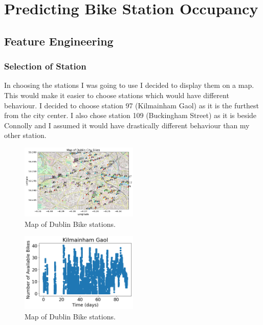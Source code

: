 \maketitle


\section{Predicting Bike Station Occupancy}
\subsection{Feature Engineering}
\subsubsection{Selection of Station}
In choosing the stations I was going to use I decided to display them on a map.
This would make it easier to choose stations which would have different behaviour.
I decided to choose station 97 (Kilmainham Gaol) as it is the furthest from the city center.
I also chose station 109 (Buckingham Street) as it is beside Connolly and I assumed it would have drastically different behaviour than my other station.

\begin{figure}[H]
\centering
\includegraphics[width=0.5\textwidth]{images/map.png}
\caption{Map of Dublin Bike stations.}
\end{figure}




\begin{figure}[H]
    \centering
    \includegraphics[width=0.5\textwidth]{images/kilmainham data.png}
    \caption{Map of Dublin Bike stations.}
    \end{figure}
\par 

